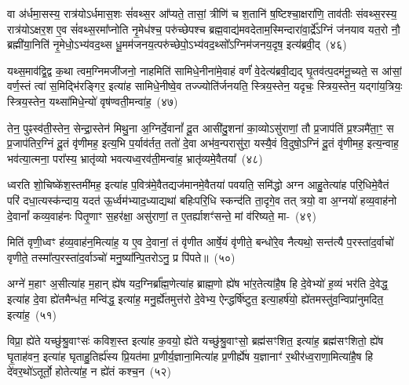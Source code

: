 वा अ॑र्धमा॒सस्य॒ रात्र॑यो\-ऽर्धमास॒शः सं॑वथ्स॒र आ᳚प्यते॒ तासां॒ त्रीणि॑ च श॒तानि॑ ष॒ष्टिश्चा॒क्षरा॑णि॒ ताव॑तीः संवथ्स॒रस्य॒ रात्र॑यो\-ऽक्षर॒श ए॒व सं॑वथ्स॒रमा᳚प्नोति नृ॒मेध॑श्च॒ परु॑च्छेपश्च ब्रह्म॒वाद्य॑मवदेताम॒स्मिन्दारा॑वा॒र्द्रे᳚\-ऽग्निं ज॑नयाव यत॒रो नौ॒ ब्रह्मी॑या॒निति॑ नृ॒मेधो॒\-ऽभ्य॑वद॒थ्स धू॒मम॑जनय॒त्परु॑च्छेपो॒\-ऽभ्य॑वद॒थ्सो᳚\-ऽग्निम॑जनय॒दृष॒ इत्य॑ब्रवी॒द्~(४६)\ip

यथ्स॒माव॑द्वि॒द्व क॒था त्वम॒ग्निमजी॑जनो॒ नाहमिति॑ सामिधे॒नीना॑मे॒वाहं वर्णं॑ वे॒देत्य॑ब्रवी॒द्यद् घृ॒तव॑त्प॒दम॑नू॒च्यते॒ स आ॑सां॒ वर्ण॒स्तं त्वा॑ स॒मिद्भि॑रङ्गिर॒ इत्या॑ह सामिधे॒नीष्वे॒व तज्ज्योति॑र्जनयति॒ स्त्रिय॒स्तेन॒ यदृचः॒ स्त्रिय॒स्तेन॒ यद्गा॑य॒त्रियः॒ स्त्रिय॒स्तेन॒ यथ्सा॑मिधे॒न्यो॑ वृष॑ण्वती॒मन्वा॑ह॒~(४७)\ip

तेन॒ पुꣴस्व॑ती॒स्तेन॒ सेन्द्रा॒स्तेन॑ मिथु॒ना अ॒ग्निर्दे॒वानां᳚ दू॒त आसी॑दु॒शना॑ का॒व्यो\-ऽसु॑राणां॒ तौ प्र॒जा\-प॑तिं प्र॒श्ञमै॑ता॒ꣳ॒ स प्र॒जा\-प॑तिर॒ग्निं दू॒तं वृ॑णीमह॒ इत्य॒भि प॒र्याव॑र्तत॒ ततो॑ दे॒वा अभ॑व॒न्परासु॑रा॒ यस्यै॒वं वि॒दुषो॒\-ऽग्निं दू॒तं वृ॑णीमह॒ इत्य॒न्वाह॒ भव॑त्या॒त्मना॒ परा᳚स्य॒ भ्रातृ॑व्यो भवत्यध्व॒रव॑ती॒मन्वा॑ह॒ भ्रातृ॑व्यमे॒वैतया᳚~(४८)\ip

ध्वरति शो॒चिष्के॑श॒स्तमी॑मह॒ इत्या॑ह प॒वित्र॑मे॒वैतद्यज॑\-मान\-मे॒वै\-तया॑ पवयति॒ समि॑द्धो अग्न आहु॒तेत्या॑ह परि॒धिमे॒वैतं परि॑ दधा॒\-त्य\-स्क॑न्दाय॒ यदत॑ ऊ॒र्ध्वम॑भ्याद॒ध्याद्यथा॑ बहिःपरि॒धि स्कन्द॑ति ता॒दृगे॒व तत् त्रयो॒ वा अ॒ग्नयो॑ हव्य॒वाह॑नो दे॒वानां᳚ कव्य॒वाह॑नः पितृ॒णाꣳ स॒हर॑क्षा॒ असु॑राणां॒ त ए॒तर्\mbox{}ह्याशꣳ॑सन्ते॒ मां व॑रिष्यते॒ मा-~(४९)\ip

मिति॑ वृणी॒ध्वꣳ ह॑व्य॒वाह॑न॒मित्या॑ह॒ य ए॒व दे॒वानां॒ तं वृ॑णीत आर्\mbox{}षे॒यं वृ॑णीते॒ बन्धो॑रे॒व नैत्यथो॒ सन्त॑त्यै प॒रस्ता॑द॒र्वाचो॑ वृणीते॒ तस्मा᳚त्प॒रस्ता॑द॒र्वाञ्चो॑ मनु॒ष्या᳚न्पि॒तरो\-ऽनु॒ प्र पि॑पते॥~(५०)\ip

{\anuvakamend[{अशा᳚न्तावाह॒ पञ्च॑दशाब्रवी॒दन्वा॑है॒तया॑ वरिष्यते॒ मामेका॒न्नत्रि॒ꣳ॒शच्च॑}]}

अग्ने॑ म॒हाꣳ अ॒सीत्या॑ह म॒हान् ह्ये॑ष यद॒ग्निर्ब्रा᳚ह्म॒णेत्या॑ह ब्राह्म॒णो ह्ये॑ष भा॑र॒तेत्या॑है॒ष हि दे॒वेभ्यो॑ ह॒व्यं भर॑ति दे॒वेद्ध॒ इत्या॑ह दे॒वा ह्ये॑तमैन्ध॑त॒ मन्वि॑द्ध॒ इत्या॑ह॒ मनु॒र्ह्ये॑तमुत्त॑रो दे॒वेभ्य॒ ऐन्द्धर्\mbox{}षि॑ष्टुत॒ इत्या॒हर्\mbox{}ष॑यो॒ ह्ये॑तमस्तु॑व॒न्विप्रा॑नुमदित॒ इत्या॑ह॒~(५१)\ip

विप्रा॒ ह्ये॑ते यच्छु॑श्रु॒वाꣳसः॑ कविश॒स्त इत्या॑ह क॒वयो॒ ह्ये॑ते यच्छु॑श्रु॒वाꣳसो॒ ब्रह्म॑सꣳशित॒ इत्या॑ह॒ ब्रह्म॑सꣳशितो॒ ह्ये॑ष घृ॒ताह॑वन॒ इत्या॑ह घृताहु॒तिर्\mbox{}ह्य॑स्य प्रि॒यत॑मा प्र॒णीर्य॒ज्ञाना॒मित्या॑ह प्र॒णीर्\mbox{}ह्ये॑ष य॒ज्ञानाꣳ॑ र॒थीर॑ध्व॒राणा॒मित्या॑है॒ष हि दे॑वर॒थो॑\-ऽतूर्तो॒ होतेत्या॑ह॒ न ह्ये॑तं कश्च॒न~(५२)\ip

